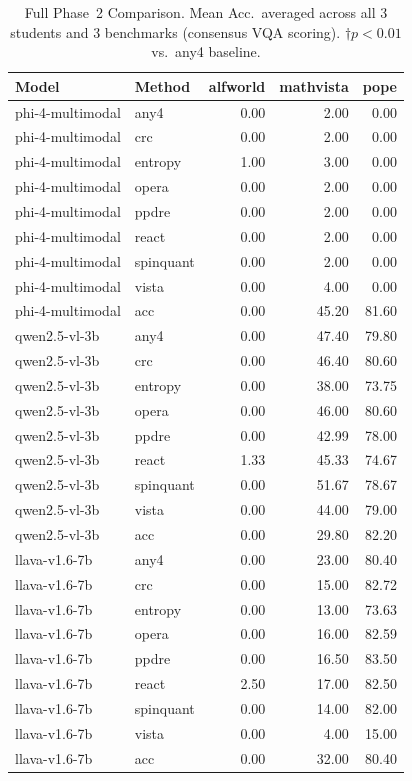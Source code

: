 \documentclass{ieeetmlcn}
\begin{document}
\begin{table}[t]
\caption{Full Phase~2 Comparison. Mean Acc.\ averaged across all 3
students and 3 benchmarks (consensus VQA scoring). $\dagger p<0.01$
vs.\ any4 baseline.}
\label{tab:baselines}
\centering
\begin{tabular}{llrrr}
\toprule
Model & Method & alfworld & mathvista & pope \\
\midrule
phi-4-multimodal & any4 & 0.00 & 2.00 & 0.00 \\
phi-4-multimodal & crc & 0.00 & 2.00 & 0.00 \\
phi-4-multimodal & entropy & 1.00 & 3.00 & 0.00 \\
phi-4-multimodal & opera & 0.00 & 2.00 & 0.00 \\
phi-4-multimodal & ppdre & 0.00 & 2.00 & 0.00 \\
phi-4-multimodal & react & 0.00 & 2.00 & 0.00 \\
phi-4-multimodal & spinquant & 0.00 & 2.00 & 0.00 \\
phi-4-multimodal & vista & 0.00 & 4.00 & 0.00 \\
phi-4-multimodal & acc & 0.00 & 45.20 & 81.60 \\
qwen2.5-vl-3b & any4 & 0.00 & 47.40 & 79.80 \\
qwen2.5-vl-3b & crc & 0.00 & 46.40 & 80.60 \\
qwen2.5-vl-3b & entropy & 0.00 & 38.00 & 73.75 \\
qwen2.5-vl-3b & opera & 0.00 & 46.00 & 80.60 \\
qwen2.5-vl-3b & ppdre & 0.00 & 42.99 & 78.00 \\
qwen2.5-vl-3b & react & 1.33 & 45.33 & 74.67 \\
qwen2.5-vl-3b & spinquant & 0.00 & 51.67 & 78.67 \\
qwen2.5-vl-3b & vista & 0.00 & 44.00 & 79.00 \\
qwen2.5-vl-3b & acc & 0.00 & 29.80 & 82.20 \\
llava-v1.6-7b & any4 & 0.00 & 23.00 & 80.40 \\
llava-v1.6-7b & crc & 0.00 & 15.00 & 82.72 \\
llava-v1.6-7b & entropy & 0.00 & 13.00 & 73.63 \\
llava-v1.6-7b & opera & 0.00 & 16.00 & 82.59 \\
llava-v1.6-7b & ppdre & 0.00 & 16.50 & 83.50 \\
llava-v1.6-7b & react & 2.50 & 17.00 & 82.50 \\
llava-v1.6-7b & spinquant & 0.00 & 14.00 & 82.00 \\
llava-v1.6-7b & vista & 0.00 & 4.00 & 15.00 \\
llava-v1.6-7b & acc & 0.00 & 32.00 & 80.40 \\
\bottomrule
\end{tabular}

\end{table}
\end{document}
